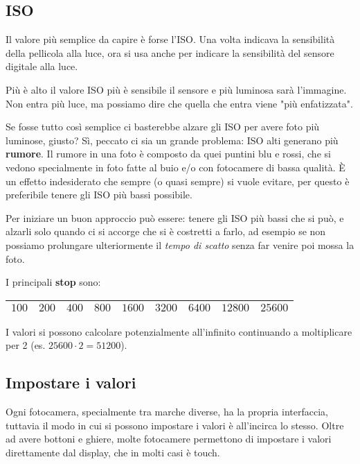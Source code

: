 \subsection{ISO}  \label{subsec:ISO}
Il valore più semplice da capire è forse l'ISO.
Una volta indicava la sensibilità della pellicola alla luce, ora si usa anche per indicare la sensibilità del sensore digitale alla luce.

Più è alto il valore ISO più è sensibile il sensore e più luminosa sarà l'immagine.\\
\nb Non entra più luce, ma possiamo dire che quella che entra viene "più enfatizzata".

Se fosse tutto così semplice ci basterebbe alzare gli ISO per avere foto più luminose, giusto? Sì, peccato ci sia un grande problema: ISO alti generano più \textbf{rumore}.
Il rumore in una foto è composto da quei puntini blu e rossi, che si vedono specialmente in foto fatte al buio e/o con fotocamere di bassa qualità. È un effetto indesiderato che sempre (o quasi sempre) si vuole evitare,
per questo è preferibile tenere gli ISO più bassi possibile.

Per iniziare un buon approccio può essere: tenere gli ISO più bassi che si può, e alzarli solo quando ci si accorge che si è costretti a farlo, ad esempio se non possiamo prolungare ulteriormente il \textit{tempo di scatto} senza far venire poi mossa la foto.

I principali \textbf{stop} sono:
\begin{table}[h]
    \centering
    \begin{tabular}{|l|l|l|l|l|l|l|l|l|}
        \hline
        $100$ & $200$ & $400$ & $800$ & $1600$ & $3200$ & $6400$ & $12800$ & $25600$\\
        \hline
    \end{tabular}
\end{table}

I valori si possono calcolare potenzialmente all'infinito continuando a moltiplicare per 2 (es. $25600 \cdot 2 = 51200$).



\subsection{Impostare i valori} \label{subsec:setvalori}
Ogni fotocamera, specialmente tra marche diverse, ha la propria interfaccia, tuttavia il modo in cui si possono impostare i valori è all'incirca lo stesso.
Oltre ad avere bottoni e ghiere, molte fotocamere permettono di impostare i valori direttamente dal display, che in molti casi è touch.

